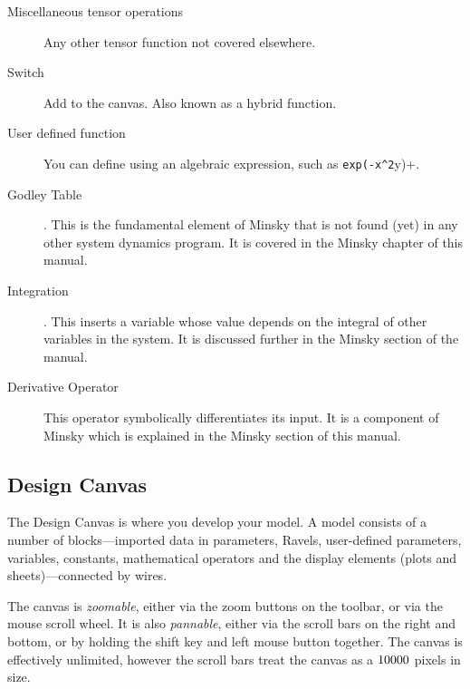 \begin{description}
\item[Miscellaneous tensor operations]
  Any other tensor function not covered elsewhere.

\item[Switch]  Add  
to the canvas. Also known as a hybrid function.

\item[User defined function] You can
  define  using an algebraic expression, such as \verb+exp(-x^2+y)+.

\item[Godley Table] . \label{GodleyTable} This is the fundamental element of Minsky that is not found (yet) in any other system dynamics program. It is covered in the Minsky chapter of this manual.


\item[Integration] .\label{Integrate}
  This inserts a variable whose value depends on the integral of other variables in the system. It is discussed further in the Minsky section of the manual.
  
\item[Derivative Operator]  This operator symbolically differentiates its input. It is a component of Minsky which is explained in the Minsky section of this manual.

\end{description}

\subsection{Design Canvas}
\label{DesignCanvas}\label{tabs:Wiring}

The Design Canvas is where you develop your model. A model consists of a number of blocks---imported data in parameters, Ravels, user-defined parameters, variables, constants, mathematical operators and the display elements (plots and sheets)---connected by wires. 

The canvas is {\em zoomable}, either via the zoom buttons on the toolbar, or via the mouse scroll wheel. It is also {\em pannable}, either via the
scroll bars on the right and bottom, or by holding the shift key and left mouse button together. The canvas is effectively unlimited, however the scroll bars treat the canvas as a $10000\time10000$ pixels in size.

